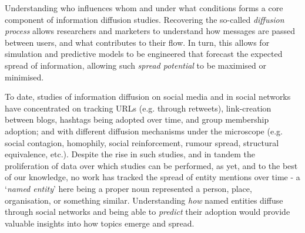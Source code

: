 \documentclass[10pt,journal,compsoc]{IEEEtran}
\begin{document}
\maketitle


\IEEEdisplaynontitleabstractindextext



%
\IEEEpeerreviewmaketitle


Understanding who influences whom and under what conditions forms a core component of information diffusion studies.
Recovering the so-called \emph{diffusion process} allows researchers and marketers to understand how messages are passed between users, and what contributes to their flow.
In turn, this allows for simulation and predictive models to be engineered that forecast the expected spread of information, allowing such \emph{spread potential} to be maximised or minimised.

To date, studies of information diffusion on social media and in social networks have concentrated on tracking URLs (e.g. through retweets), link-creation between blogs, hashtags being adopted over time, and group membership adoption; and with different diffusion mechanisms under the microscope (e.g. social contagion, homophily, social reinforcement, rumour spread, structural equivalence, etc.).
Despite the rise in such studies, and in tandem the proliferation of data over which studies can be performed, as yet, and to the best of our knowledge, no work has tracked the spread of entity mentions over time - a `\emph{named entity}' here being a proper noun represented a person, place, organisation, or something similar.
Understanding \emph{how} named entities diffuse through social networks and being able to \emph{predict} their adoption would provide valuable insights into how topics emerge and spread.
\end{document}
